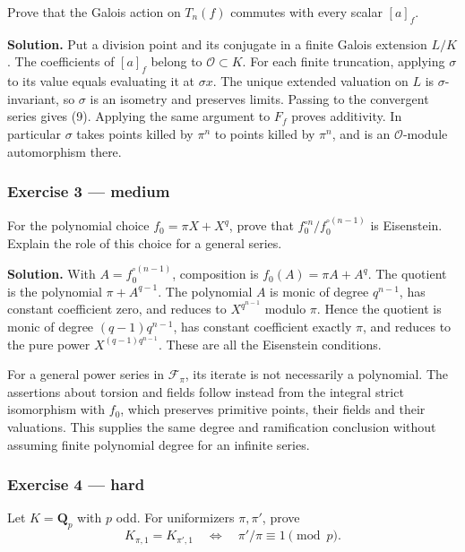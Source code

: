 \documentclass[11pt,a4paper]{article}
\begin{document}
Prove that the Galois action on \(T_n(f)\) commutes with every scalar
\([a]_f\).

\textbf{Solution.} Put a division point and its conjugate in a finite
Galois extension \(L/K\). The coefficients of \([a]_f\) belong to
\(\mathcal O\subset K\). For each finite truncation, applying \(\sigma\)
to its value equals evaluating it at \(\sigma x\). The unique extended
valuation on \(L\) is \(\sigma\)-invariant, so \(\sigma\) is an isometry
and preserves limits. Passing to the convergent series gives (9).
Applying the same argument to \(F_f\) proves additivity. In particular
\(\sigma\) takes points killed by \(\pi^n\) to points killed by
\(\pi^n\), and is an \(\mathcal O\)-module automorphism there.

\subsubsection{Exercise 3 --- medium}\label{exercise-3-medium}

For the polynomial choice \(f_0=\pi X+X^q\), prove that
\(f_0^{\circ n}/f_0^{\circ(n-1)}\) is Eisenstein. Explain the role of
this choice for a general series.

\textbf{Solution.} With \(A=f_0^{\circ(n-1)}\), composition is
\(f_0(A)=\pi A+A^q\). The quotient is the polynomial \(\pi+A^{q-1}\).
The polynomial \(A\) is monic of degree \(q^{n-1}\), has constant
coefficient zero, and reduces to \(X^{q^{n-1}}\) modulo \(\pi\). Hence
the quotient is monic of degree \((q-1)q^{n-1}\), has constant
coefficient exactly \(\pi\), and reduces to the pure power
\(X^{(q-1)q^{n-1}}\). These are all the Eisenstein conditions.

For a general power series in \(\mathcal F_\pi\), its iterate is not
necessarily a polynomial. The assertions about torsion and fields follow
instead from the integral strict isomorphism with \(f_0\), which
preserves primitive points, their fields and their valuations. This
supplies the same degree and ramification conclusion without assuming
finite polynomial degree for an infinite series.

\subsubsection{Exercise 4 --- hard}\label{exercise-4-hard}

Let \(K=\mathbf Q_p\) with \(p\) odd. For uniformizers \(\pi,\pi'\),
prove \[
K_{\pi,1}=K_{\pi',1}
\quad\Longleftrightarrow\quad
\pi'/\pi\equiv1\pmod p.
\tag{19}
\]
\end{document}
